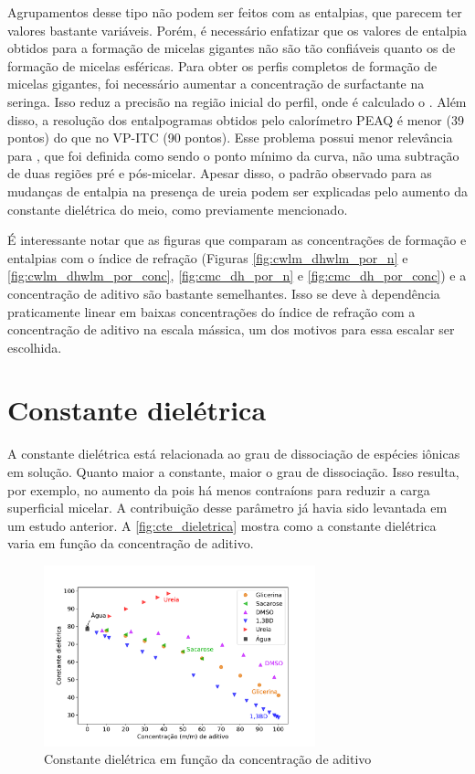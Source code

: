 		Agrupamentos desse tipo não podem ser feitos com as entalpias, que parecem ter valores bastante variáveis. Porém, é necessário enfatizar que os valores de entalpia obtidos para a formação de micelas gigantes não são tão confiáveis quanto os de formação de micelas esféricas. Para obter os perfis completos de formação de micelas gigantes, foi necessário aumentar a concentração de surfactante na seringa. Isso reduz a precisão na região inicial do perfil, onde é calculado o \DHwlm. Além disso, a resolução dos entalpogramas obtidos pelo calorímetro PEAQ é menor (39 pontos) do que no VP-ITC (90 pontos). Esse problema possui menor relevância para \cwlm{}, que foi definida como sendo o ponto mínimo da curva, não uma subtração de duas regiões pré e pós-micelar.  Apesar disso, o padrão observado para as mudanças de entalpia na presença de ureia podem ser explicadas pelo aumento da constante dielétrica do meio, como previamente mencionado.
	
		É interessante notar que as figuras que comparam as concentrações de formação e entalpias com o índice de refração (Figuras \ref{fig:cwlm_dhwlm_por_n} e \ref{fig:cwlm_dhwlm_por_conc}, \ref{fig:cmc_dh_por_n} e \ref{fig:cmc_dh_por_conc}) e a concentração de aditivo são bastante semelhantes. Isso se deve à dependência praticamente linear em baixas concentrações do índice de refração com a concentração de aditivo na escala mássica, um dos motivos para essa escalar ser escolhida.
		
		\FloatBarrier
		
		\section{Constante dielétrica}
		
		A constante dielétrica está relacionada ao grau de dissociação de espécies iônicas em solução. Quanto maior a constante, maior o grau de dissociação. Isso resulta, por exemplo, no aumento da \cmc{} pois há menos contraíons para reduzir a carga superficial micelar. A contribuição desse parâmetro já havia sido levantada em um estudo anterior. %
		A \autoref{fig:cte_dieletrica} mostra como a constante dielétrica varia em função da concentração de aditivo. %

		
		\begin{figure}[h]
			\centering
			\includegraphics[width=0.7\textwidth]{imagens/propriedades/cte_dieletrica}
			\caption{Constante dielétrica em função da concentração de aditivo}  %
			\label{fig:cte_dieletrica}
		\end{figure}
	
